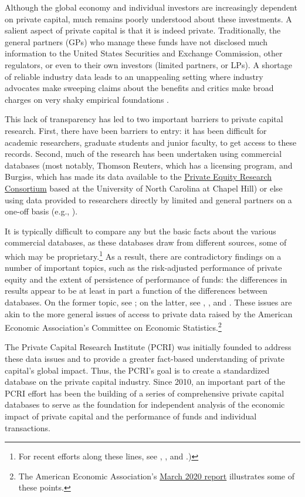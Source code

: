 \documentclass[
]{WileySix}
\begin{document}
Although the global economy and individual investors are increasingly dependent on private capital, much remains poorly understood about these investments. A salient aspect of private capital is that it is indeed private. Traditionally, the general partners (GPs) who manage these funds have not disclosed much information to the United States Securities and Exchange Commission, other regulators, or even to their own investors (limited partners, or LPs). A shortage of reliable industry data leads to an unappealing setting where industry advocates make sweeping claims about the benefits and critics make broad charges on very shaky empirical foundations \citep{kaplan2017}.

This lack of transparency has led to two important barriers to private capital research. First, there have been barriers to entry: it has been difficult for academic researchers, graduate students and junior faculty, to get access to these records. Second, much of the research has been undertaken using commercial databases (most notably, Thomson Reuters, which has a licensing program, and Burgiss, which has made its data available to the \href{http://uncipc.org/index.php/initiativecat/private-equity/}{Private Equity Research Consortium} based at the University of North Carolina at Chapel Hill) or else using data provided to researchers directly by limited and general partners on a one-off basis (e.g., \citet{gompers1997}).

It is typically difficult to compare any but the basic facts about the various commercial databases, as these databases draw from different sources, some of which may be proprietary.\footnote{For recent efforts along these lines, see \citet{brown2015}, \citet{maats2011}, and \citet{kaplan2017}.)} As a result, there are contradictory findings on a number of important topics, such as the risk-adjusted performance of private equity and the extent of persistence of performance of funds: the differences in results appear to be at least in part a function of the differences between databases. On the former topic, see \citet{korteweg2019}; on the latter, see \citet{braun2017}, \citet{harris2014}, and \citet{korteweg2015}. These issues are akin to the more general issues of access to private data raised by the American Economic Association's Committee on Economic Statistics.\footnote{The American Economic Association's \href{https://www.aeaweb.org/content/file?id=11794}{March 2020 report} illustrates some of these points.}

The Private Capital Research Institute (PCRI) was initially founded to address these data issues and to provide a greater fact-based understanding of private capital's global impact. Thus, the PCRI's goal is to create a standardized database on the private capital industry. Since 2010, an important part of the PCRI effort has been the building of a series of comprehensive private capital databases to serve as the foundation for independent analysis of the economic impact of private capital and the performance of funds and individual transactions.
\end{document}
